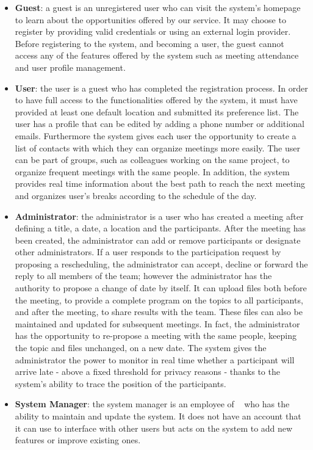 \begin{itemize}
	\item \textbf{{Guest}}: a guest is an unregistered user who can visit the system's homepage to learn about the opportunities offered by our service. It may choose to register by providing valid credentials or using an external login provider. Before registering to the system, and becoming a user, the guest cannot access any of the features offered by the system such as meeting attendance and user profile management.
	\item \textbf{{User}}: the user is a guest who has completed the registration process. In order to have full access to the functionalities offered by the system, it must have provided at least one default location and submitted its preference list. The user has a profile that can be edited by adding a phone number or additional emails. Furthermore the system gives each user the opportunity to create a list of contacts with which they can organize meetings more easily. The user can be part of groups, such as colleagues working on the same project, to organize frequent meetings with the same people. In addition, the system provides real time information about the best path to reach the next meeting and organizes user's breaks according to the schedule of the day.
	\item \textbf{{Administrator}}: the administrator is a user who has created a meeting after defining a title, a date, a location and the participants.  After the meeting has been created, the administrator can add or remove participants or designate other administrators. If a user responds to the participation request by proposing a rescheduling, the administrator can accept, decline or forward the reply to all members of the team; however the administrator has the authority to propose a change of date by itself. \newline
	It can upload files both before the meeting, to provide a complete program on the topics to all participants, and after the meeting, to share results with the team. These files can also be maintained and updated for subsequent meetings. In fact, the administrator has the opportunity to re-propose a meeting with the same people, keeping the topic and files unchanged, on a new date. \newline
	The system gives the administrator the power to monitor in real time whether a participant will arrive late - above a fixed threshold for privacy reasons - thanks to the system's ability to trace the position of the participants.
	\item \textbf{{System Manager}}: the system manager is an employee of \projectname~  who has the ability to maintain and update the system. It does not have an account that it can use to interface with other users but acts on the system to add new features or improve existing ones.
\end{itemize}
